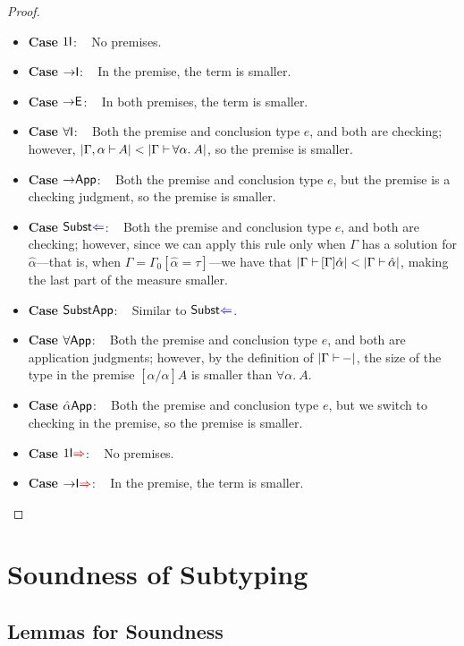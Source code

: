 \documentclass[a4paper]{article}
\newcommand{\mathcolor}[2]{\text{\textcolor{#1}{\ensuremath{#2}}}}
\newcommand{\arr}{\rightarrow}
\def\CompactJudgments{0}
\newcommand{\entails}{\mathrel{\ifnum\CompactJudgments=1\vdash \else \vdash\,\fi}}
\newcommand{\tyname}[1]{\textsf{\normalfont #1}}
\newcommand{\unitty}{\tyname{1}}
\newcommand{\ProofCaseRule}[1]{\item \textbf{Case }\textrm{{#1}}: ~ }
\newcommand{\AllSym}{\forall}
\newcommand{\xAll}[1]{\AllSym#1}
\newcommand{\All}[1]{\xAll{#1}.\:}
\newcommand{\chkcolor}{dBlue}
\newcommand{\syncolor}{dRed}
\newcommand{\chk}{\mathrel{\mathcolor{\chkcolor}{\Leftarrow}}}
\newcommand{\uncoloredsyn}{{\Rightarrow}}
\newcommand{\syn}{\mathrel{\mathcolor{\syncolor}{\uncoloredsyn}}}
\newcommand{\hypeq}[2]{{#1} = {#2}}
\newcommand{\alltype}[1]{\All{#1}}
\newcommand{\typesize}[2]{|{#1} {\;\entails} {#2}|}
\newcommand{\ahat}{\hat{\alpha}}
\newcommand{\rulename}[1]{\text{\normalfont\textsf{#1}}}
\newcommand{\Tyrulename}[1]{\ensuremath{\rulename{#1}}\xspace}
\newcommand{\Introrulename}[1]{\Tyrulename{\ensuremath{#1}I}}
\newcommand{\IntroSynrulename}[1]{\Tyrulename{\ensuremath{#1}I$\syn$}}
\newcommand{\Elimrulename}[1]{\Tyrulename{\ensuremath{#1}E}}
\newcommand{\Apprulename}[1]{\Tyrulename{\ensuremath{#1}App}}
\newcommand{\SubstChk}{\Tyrulename{Subst$\chk$}}
\newcommand{\UnitIntro}{\Introrulename{\unitty}}
\newcommand{\UnitIntroSyn}{\IntroSynrulename{\unitty}}
\newcommand{\ArrIntro}{\Introrulename{\arr}}
\newcommand{\ArrIntroSyn}{\IntroSynrulename{\arr}}
\newcommand{\ArrElim}{\Elimrulename{\arr}}
\newcommand{\AllIntro}{\Introrulename{\AllSym}}
\newcommand{\ArrApp}{\Apprulename{\arr}}
\newcommand{\AllApp}{\Apprulename{\forall}}
\newcommand{\SubstApp}{\Apprulename{\rulename{Subst}}}
\newcommand{\SolveApp}{\Apprulename{\ahat}}
\begin{document}
\begin{proof}
\begin{itemize}
      \ProofCaseRule{\UnitIntro}  No premises.

      \ProofCaseRule{\ArrIntro}  In the premise, the term is smaller.

      \ProofCaseRule{\ArrElim}  In both premises, the term is smaller.
      
      \ProofCaseRule{\AllIntro}  Both the premise and conclusion type $e$, and both are checking;
         however, $\typesize{\Gamma, \alpha}{A} < \typesize{\Gamma}{\alltype{\alpha}{A}}$,
         so the premise is smaller.
         


      \ProofCaseRule{\ArrApp}
         Both the premise and conclusion type $e$, but the premise is a
         checking judgment, so the premise is smaller.
      
      \ProofCaseRule{\SubstChk}  Both the premise and conclusion type $e$, and both are checking;
        however, since we can apply this rule only when $\Gamma$ has a solution for
        $\ahat$---that is, when $\Gamma = \Gamma_0[\hypeq{\ahat}{\tau}]$---we have that
        $\typesize{\Gamma}{[\Gamma]\ahat} < \typesize{\Gamma}{\ahat}$, making the last
        part of the measure smaller.

      \ProofCaseRule{\SubstApp}  Similar to \SubstChk.
      
      


      \ProofCaseRule{\AllApp}  Both the premise and conclusion type $e$, and both are application
        judgments; however, by the definition of $\typesize{\Gamma}{-}$, the size of
        the type in the premise $[\ahat/\alpha]A$ is smaller than $\alltype{\alpha}{A}$.

      \ProofCaseRule{\SolveApp}  Both the premise and conclusion type $e$, but we switch to
         checking in the premise, so the premise is smaller.
      
      \ProofCaseRule{\UnitIntroSyn}  No premises.

      \ProofCaseRule{\ArrIntroSyn}  In the premise, the term is smaller.
    \qedhere
    \end{itemize}
\end{proof}



\section{Soundness of Subtyping}

\subsection{Lemmas for Soundness}
\end{document}
